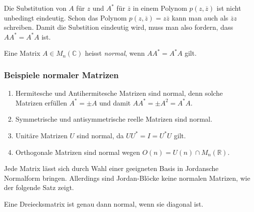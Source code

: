 Die Substitution von $A$ für $z$ und $A^*$ für $\overline{z}$
in einem Polynom $p(z,\overline{z})$ ist nicht unbedingt eindeutig.
Schon das Polynom $p(z,\overline{z})=z\overline{z}$ kann man auch
als $\overline{z}z$ schreiben.
Damit die Substition eindeutig wird, muss man also fordern, dass
$AA^* = A^*A$ ist.

\begin{definition}
Eine Matrix $A\in M_n(\mathbb{C})$ heisst {\em normal}, wenn $AA^*=A^*A$ gilt.
%
\end{definition}

\subsubsection{Beispiele normaler Matrizen}

\begin{enumerate}
\item
Hermitesche und Antihermitesche Matrizen sind normal, denn solche
%
%
Matrizen erfüllen $A^*=\pm A$ und damit
\(
AA^* = \pm A^2 = A^*A.
\)
\item
Symmetrische und antisymmetrische reelle Matrizen sind normal.
%
%
\item
Unitäre Matrizen $U$ sind normal, da $UU^*=I=U^*U$ gilt.
%
\item
Orthogonale Matrizen sind normal wegen $O(n) = U(n) \cap M_n(\mathbb{R})$.
%
\end{enumerate}

Jede Matrix lässt sich durch Wahl einer geeigneten Basis in Jordansche 
Normalform bringen.
Allerdings sind Jordan-Blöcke keine normalen Matrizen, wie der folgende
Satz zeigt.

\begin{satz}
Eine Dreiecksmatrix ist genau dann normal, wenn sie diagonal ist.
%
\end{satz}

